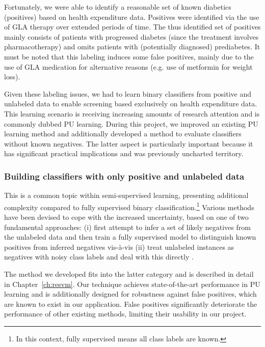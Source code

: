 Fortunately, we were able to identify a reasonable set of known diabetics (positives) based on health expenditure data. Positives were identified via the use of GLA therapy over extended periods of time. The thus identified set of positives mainly consists of patients with progressed diabetes (since the treatment involves pharmacotherapy) and omits patients with (potentially diagnosed) prediabetes. It must be noted that this labeling induces some false positives, mainly due to the use of GLA medication for alternative reasons (e.g. use of metformin for weight loss).

Given these labeling issues, we had to learn binary classifiers from positive and unlabeled data to enable screening based exclusively on health expenditure data. This learning scenario is receiving increasing amounts of research attention and is commonly dubbed PU learning. During this project, we improved an existing PU learning method and additionally developed a method to evaluate classifiers without known negatives. The latter aspect is particularly important because it has significant practical implications and was previously uncharted territory.

\subsubsection{Building classifiers with only positive and unlabeled data} 
This is a common topic within semi-supervised learning, presenting additional complexity compared to fully supervised binary classification.\footnote{In this context, fully supervised means all class labels are known.} Various methods have been devised to cope with the increased uncertainty, based on one of two fundamental approaches:
(i) first attempt to infer a set of likely negatives from the unlabeled data and then train a fully supervised model to distinguish known positives from inferred negatives \citep{liu02partially,Yu:2005:SCM:1108759.1108762,Li03learningto} vis-\`a-vis (ii) treat unlabeled instances as negatives with noisy class labels and deal with this directly \citep{Elkan:2008:LCO:1401890.1401920,Lee03learningwith,Liu:2003:BTC:951949.952139,mordelet2014bagging,Liu:2005:PSC:2138033.2138052}.

The method we developed fits into the latter category and is described in detail in Chapter~\ref{ch:resvm}. Our technique achieves state-of-the-art performance in PU learning and is additionally designed for robustness against false positives, which are known to exist in our application. False positives significantly deteriorate the performance of other existing methods, limiting their usability in our project.


